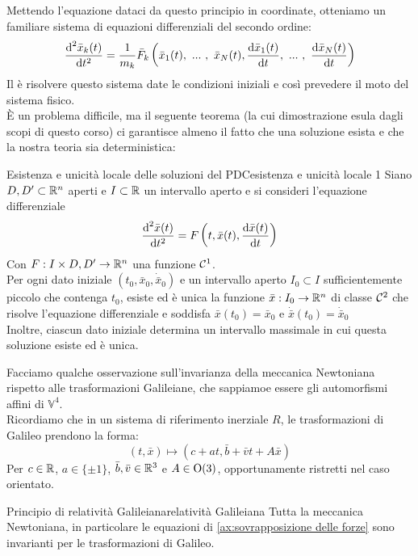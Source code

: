 \documentclass[openany]{book}
\renewcommand\C{\mc{C}}
\renewcommand\V{\mathbb{V}}
\begin{document}
Mettendo l'equazione dataci da questo principio in coordinate, otteniamo un familiare sistema di equazioni differenziali del secondo ordine:
\[ \frac{\text{d}^2 \bar x_k(t) }{\text{d} t^2} = \frac{1}{m_k}  \bar F_k \left(\bar x_1(t),\ ...\ ,\ \bar x_N(t), \frac{\text{d} \bar x_1(t)}{\text{d} t},\ ...\ ,\  \frac{\text{d} \bar x_N(t)}{\text{d} t}\right) \]
Il  è risolvere questo sistema date le condizioni iniziali e così prevedere il moto del sistema fisico.\\
È un problema difficile, ma il seguente teorema (la cui dimostrazione esula dagli scopi di questo corso) ci garantisce almeno il fatto che una soluzione esista e che la nostra teoria sia deterministica:

\begin{theorem}{Esistenza e unicità locale delle soluzioni del PDC}{esistenza e unicità locale 1}
    Siano $D,D' \subset \mathbb{R}^n$ aperti e $I \subset \mathbb{R}$ un intervallo aperto e si consideri l'equazione differenziale 
    \[ \frac{\text{d}^2 \bar x(t)}{\text{d} t^2} = F\left( t, \bar x(t), \frac{\text{d} \bar x(t)}{\text{d} t} \right) \]
    Con $F : I\times D, D'\to\mathbb{R}^n$ una funzione $\C^1$.\\
    Per ogni dato iniziale $(t_0, \bar x_0, \dot{\bar x}_0)$ e un intervallo aperto $I_0\subset I$ sufficientemente piccolo che contenga $t_0$, esiste ed è unica la funzione $\bar x:I_0\to\mathbb{R}^n$ di classe $\C^2$ che risolve l'equazione differenziale e soddisfa $\bar x(t_0) = \bar x_0$ e $\dot{ \bar x}(t_0) = \dot {\bar x}_0$\\
    Inoltre, ciascun dato iniziale determina un intervallo massimale in cui questa soluzione esiste ed è unica.
\end{theorem}

Facciamo qualche osservazione sull'invarianza della meccanica Newtoniana rispetto alle trasformazioni Galileiane, che sappiamoe essere gli automorfismi affini di $\V^4$.\\
Ricordiamo che in un sistema di riferimento inerziale $R$, le trasformazioni di Galileo prendono la forma:
\[ (t,\bar x)\mapsto (c+at, \bar b + \bar v t + A\bar x) \]
Per $c \in \mathbb{R}$, $a \in \{\pm 1\}$, $\bar b, \bar v \in \mathbb{R}^3$ e $A \in \operatorname{O}(3)$, opportunamente ristretti nel caso orientato.

\begin{axiom}{Principio di relatività Galileiana}{relatività Galileiana}
    Tutta la meccanica Newtoniana, in particolare le equazioni di \cref{ax:sovrapposizione delle forze} sono invarianti per le trasformazioni di Galileo.
\end{axiom}
\end{document}
